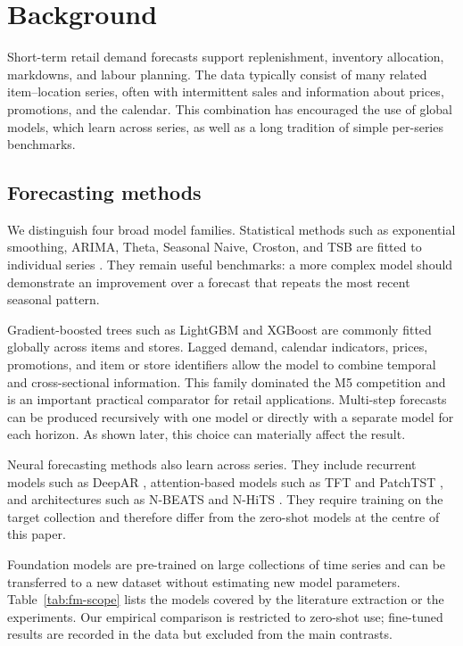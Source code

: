 \section{Background}
\label{sec:background}

Short-term retail demand forecasts support replenishment, inventory allocation,
markdowns, and labour planning. The data typically consist of many related
item--location series, often with intermittent sales and information about
prices, promotions, and the calendar. This combination has encouraged the use
of global models, which learn across series, as well as a long tradition of
simple per-series benchmarks.

\subsection{Forecasting methods}
\label{sec:taxonomy}

We distinguish four broad model families. Statistical methods such as
exponential smoothing, ARIMA, Theta, Seasonal Naive, Croston, and TSB are fitted
to individual series \citep{croston1972forecasting,teunter2011intermittent}.
They remain useful benchmarks: a more complex model should demonstrate an
improvement over a forecast that repeats the most recent seasonal pattern.

Gradient-boosted trees such as LightGBM \citep{ke2017lightgbm} and XGBoost
\citep{chen2016xgboost} are commonly fitted globally across items and stores.
Lagged demand, calendar indicators, prices, promotions, and item or store
identifiers allow the model to combine temporal and cross-sectional
information. This family dominated the M5 competition and is an important
practical comparator for retail applications. Multi-step forecasts can be
produced recursively with one model or directly with a separate model for each
horizon. As shown later, this choice can materially affect the result.

Neural forecasting methods also learn across series. They include recurrent
models such as DeepAR \citep{salinas2020deepar}, attention-based models such as
TFT and PatchTST \citep{lim2021tft,nie2023patchtst}, and architectures such as
N-BEATS and N-HiTS \citep{oreshkin2020nbeats,challu2023nhits}. They require
training on the target collection and therefore differ from the zero-shot
models at the centre of this paper.

Foundation models are pre-trained on large collections of time series and can
be transferred to a new dataset without estimating new model parameters.
Table~\ref{tab:fm-scope} lists the models covered by the literature extraction
or the experiments. Our empirical comparison is restricted to zero-shot use;
fine-tuned results are recorded in the data but excluded from the main
contrasts.

